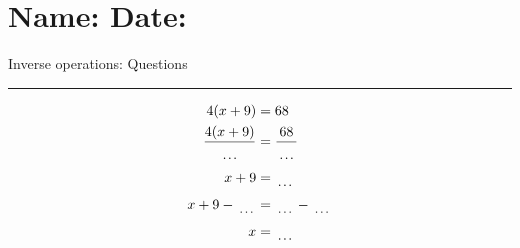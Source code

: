 \documentclass[12pt]{article}
\def \HeadingQuestions {\section*{\Large Name: \underline{\hspace{8cm}} \hfill Date: \underline{\hspace{3cm}}} \vspace{-3mm}
{Inverse operations: Questions} \vspace{1pt}\hrule}
\newcounter{minipagecount}
\begin{document}
\HeadingQuestions
\vspace{1mm}
\begin{multicols}{2}
\noindent{(\theminipagecount)}\hspace{0.1mm} %
\begin{minipage}[t]{0.45\textwidth} %
    \vspace{-26pt}  %
    \raggedright %
    \begin{align*} %
        4(x + 9) &= 68\\
        \frac{4(x+9)}{\dotuline{\hspace{5mm}}} &= \frac{68}{\dotuline{\hspace{5mm}}}\\
        x + 9 &= \dotuline{\hspace{5mm}}\\
        x + 9 - \dotuline{\hspace{5mm}} &= \dotuline{\hspace{5mm}} - \dotuline{\hspace{5mm}}\\
        x &= \dotuline{\hspace{5mm}}\\
    \end{align*}
\end{minipage} %
\noindent{(\theminipagecount)}\hspace{0.1mm} %
\begin{minipage}[t]{0.45\textwidth} %
    \vspace{-26pt}  %

\end{minipage}
\end{multicols}
\end{document}
